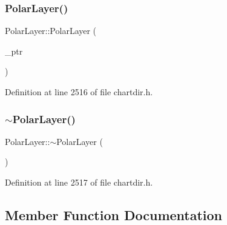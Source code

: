 \subsubsection{\texorpdfstring{Polar\+Layer()}{PolarLayer()}}
{\footnotesize\ttfamily Polar\+Layer\+::\+Polar\+Layer (\begin{DoxyParamCaption}\item[{Polar\+Layer\+Internal $\ast$}]{\+\_\+ptr }\end{DoxyParamCaption})\hspace{0.3cm}{\ttfamily [inline]}}



Definition at line 2516 of file chartdir.\+h.

\mbox{\label{class_polar_layer_a31717156ea65ea5daa010c51322bec9c}} 
\subsubsection{\texorpdfstring{$\sim$\+Polar\+Layer()}{~PolarLayer()}}
{\footnotesize\ttfamily Polar\+Layer\+::$\sim$\+Polar\+Layer (\begin{DoxyParamCaption}{ }\end{DoxyParamCaption})\hspace{0.3cm}{\ttfamily [inline]}}



Definition at line 2517 of file chartdir.\+h.



\subsection{Member Function Documentation}
\mbox{\label{class_polar_layer_afacdf935ec0cd4a6c99bee27491c1078}} 

